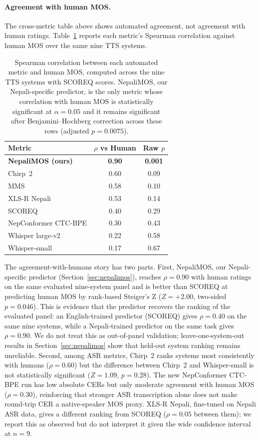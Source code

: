 \documentclass[11pt]{article}
\begin{document}
\paragraph{Agreement with human MOS.} The cross-metric table above shows automated agreement, not agreement with human ratings. Table~\ref{tab:metric_vs_human} reports each metric's Spearman correlation against human MOS over the same nine TTS systems.

\begin{table}[h]
\centering
\caption{Spearman correlation between each automated metric and human MOS, computed across the nine TTS systems with SCOREQ scores. NepaliMOS, our Nepali-specific predictor, is the only metric whose correlation with human MOS is statistically significant at $\alpha = 0.05$ and it remains significant after Benjamini--Hochberg correction across these rows (adjusted $p=0.0075$).}
\label{tab:metric_vs_human}
\begin{tabular}{lcc}
\toprule
Metric & $\rho$ vs Human & Raw $p$ \\
\midrule
\textbf{NepaliMOS (ours)} & \textbf{0.90} & \textbf{0.001} \\
Chirp~2 & 0.60 & 0.09 \\
MMS & 0.58 & 0.10 \\
XLS-R Nepali & 0.53 & 0.14 \\
SCOREQ & 0.40 & 0.29 \\
NepConformer CTC-BPE & 0.30 & 0.43 \\
Whisper large-v2 & 0.22 & 0.58 \\
Whisper-small & 0.17 & 0.67 \\
\bottomrule
\end{tabular}
\end{table}

The agreement-with-humans story has two parts. First, NepaliMOS, our Nepali-specific predictor (Section~\ref{sec:nepalimos}), reaches $\rho = 0.90$ with human ratings on the same evaluated nine-system panel and is better than SCOREQ at predicting human MOS by rank-based Steiger's Z ($Z = +2.00$, two-sided $p = 0.046$). This is evidence that the predictor recovers the ranking of the evaluated panel: an English-trained predictor (SCOREQ) gives $\rho = 0.40$ on the same nine systems, while a Nepali-trained predictor on the same task gives $\rho = 0.90$. We do not treat this as out-of-panel validation; leave-one-system-out results in Section~\ref{sec:nepalimos} show that held-out system ranking remains unreliable. Second, among ASR metrics, Chirp~2 ranks systems most consistently with humans ($\rho = 0.60$) but the difference between Chirp~2 and Whisper-small is not statistically significant ($Z = 1.09$, $p = 0.28$). The new NepConformer CTC-BPE run has low absolute CERs but only moderate agreement with human MOS ($\rho = 0.30$), reinforcing that stronger ASR transcription alone does not make round-trip CER a native-speaker MOS proxy. XLS-R Nepali, fine-tuned on Nepali ASR data, gives a different ranking from SCOREQ ($\rho = 0.05$ between them); we report this as observed but do not interpret it given the wide confidence interval at $n = 9$.
\end{document}
